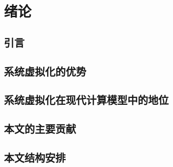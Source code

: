
\chapter{绪论}
\label{chap:what}

\section{引言}

\section{系统虚拟化的优势}

\section{系统虚拟化在现代计算模型中的地位}

\section{本文的主要贡献}

\section{本文结构安排}



